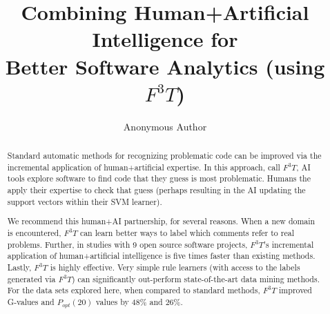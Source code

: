 \documentclass[10pt,conference]{IEEEtran}
\begin{document}
 \title{ 
Combining
Human+Artificial Intelligence for \\
 Better Software Analytics (using  $F^3T$)}
 
 
\author{
}



\author{Anonymous Author}
\maketitle

\begin{abstract}
Standard automatic methods for recognizing
problematic code can be  improved  via the
incremental application of
 human+artificial expertise.
 In this approach,  call $F^3T$,  AI tools explore  software to find code
 that they guess is most problematic.  Humans  the apply their expertise to  check that guess
 (perhaps resulting in the AI
updating the  support vectors within their SVM learner).

We recommend this human+AI partnership, for several reasons.
When a new domain is encountered, $F^3T$ can  learn better ways to label which comments
refer to real problems.
Further, 
in studies with 9 open source software projects,
$F^3T$'s incremental application of human+artificial  intelligence
is five times   faster than existing methods.
Lastly,   $F^3T$ is  highly effective.
Very simple rule learners (with
access to the labels generated via $F^3T$) can significantly out-perform
state-of-the-art data mining methods. For the data sets explored here, when compared to standard methods, 
$F^3T$  improved 
G-values and $P_{opt}(20)$ values by  48\% and 26\%.  






\end{abstract}
 
\end{document}
